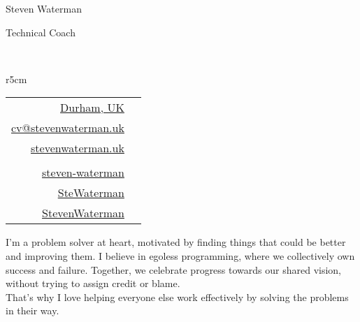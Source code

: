 \documentclass[hidelinks, 12pt, a4paper]{article}
\begin{document}
	
	
	\begin{Huge}Steven Waterman\end{Huge}
	
	\vspace{6pt}\hspace{120pt} \begin{large}Technical Coach\end{large}\\
	
	\begin{wraptable}{r}{5cm}
		\vspace{-75pt}
		\begin{tabular}{rc}
			\href{https://en.wikipedia.org/wiki/Durham,_England}{Durham, UK} & \href{https://en.wikipedia.org/wiki/Durham,_England}{\faHome} \\
			\href{mailto:cv@stevenwaterman.uk}{cv@stevenwaterman.uk} & \href{mailto:cv@stevenwaterman.uk}{\faEnvelope} \\
			\href{http://www.stevenwaterman.uk}{stevenwaterman.uk} & \href{http://www.stevenwaterman.uk}{\faLink} \\
			&\\
			\href{https://www.linkedin.com/in/steven-waterman/}{steven-waterman} & \href{https://www.linkedin.com/in/steven-waterman/}{\faLinkedin} \\
			\href{https://twitter.com/SteWaterman}{SteWaterman} & \href{https://twitter.com/SteWaterman}{\faTwitter} \\
			\href{https://github.com/stevenwaterman}{StevenWaterman} & \href{https://github.com/stevenwaterman}{\faGithub}
		\end{tabular}
	\end{wraptable}
	
	I'm a problem solver at heart, motivated by finding things that could be better and improving them.
	I believe in egoless programming, where we collectively own success and failure.
	Together, we celebrate progress towards our shared vision, without trying to assign credit or blame.\\

	That's why I love helping everyone else work effectively by solving the problems in their way.
	
%		
	
\end{document}
